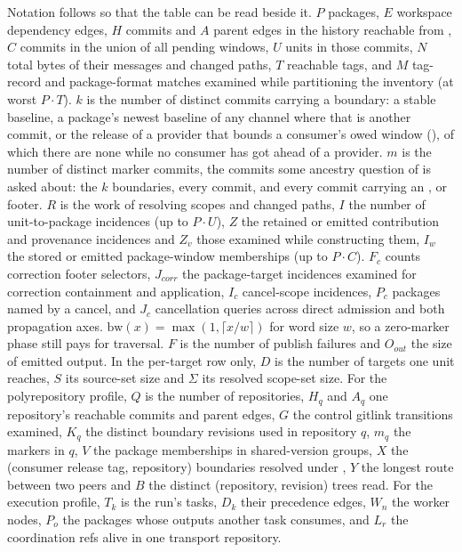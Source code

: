 Notation follows  so that the table can be read beside it. $P$
packages, $E$ workspace dependency edges, $H$ commits and $A$ parent edges in
the history reachable from \Head{}, $C$ commits in the union of all pending
windows, $U$ units in those commits, $N$ total bytes of their messages and
changed paths, $T$ reachable tags, and $M$ tag-record and package-format
matches examined while partitioning the inventory (at worst $P \cdot T$). $k$
is the number of distinct commits carrying a boundary: a stable baseline, a
package's newest baseline of any channel where that is another commit, or the
release of a provider that bounds a consumer's owed window (), of
which there are none while no consumer has got ahead of a provider. $m$ is the
number of distinct marker commits, the commits some ancestry question of
 is asked about: the $k$ boundaries, every  commit, and
every commit carrying an ,  or 
footer. $R$ is the work of resolving scopes and changed paths, $I$ the number
of unit-to-package incidences (up to $P \cdot U$), $Z$ the retained or
emitted contribution and provenance incidences and $Z_v$ those examined while
constructing them, $I_w$ the stored or emitted package-window memberships (up
to $P \cdot C$). $F_c$ counts correction footer selectors, $J_{corr}$ the
package-target incidences examined for correction containment and
application, $I_c$ cancel-scope incidences, $P_c$ packages named by a cancel,
and $J_c$ cancellation queries across direct admission and both propagation
axes. $\mathrm{bw}(x) = \max(1, \lceil x / w \rceil)$ for word size $w$, so a
zero-marker phase still pays for traversal. $F$ is the number of publish
failures and $O_{out}$ the size of emitted output. In the per-target row only,
$D$ is the number of targets one unit reaches, $S$ its source-set size and
$\Sigma$ its resolved scope-set size. For the polyrepository profile, $Q$ is
the number of repositories, $H_q$ and $A_q$ one repository's reachable commits
and parent edges, $G$ the control gitlink transitions examined, $K_q$ the
distinct boundary revisions used in repository $q$, $m_q$ the markers in $q$,
$V$ the package memberships in shared-version groups, $X$ the (consumer
release tag, repository) boundaries resolved under , $Y$ the
longest route between two peers and $B$ the distinct (repository, revision)
trees read. For the execution profile, $T_k$ is the run's tasks, $D_k$ their
precedence edges, $W_n$ the worker nodes, $P_o$ the packages whose outputs
another task consumes, and $L_r$ the coordination refs alive in one transport
repository.

